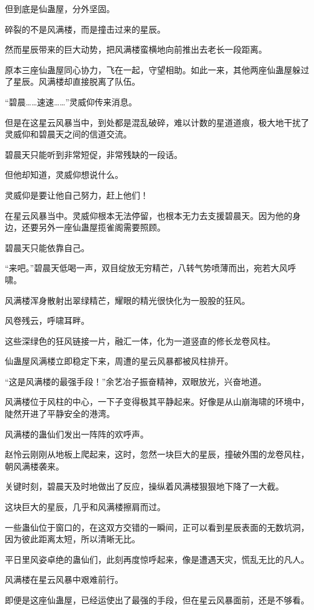 \begin{this_body}
但到底是仙蛊屋，分外坚固。

碎裂的不是风满楼，而是撞击过来的星辰。

然而星辰带来的巨大动势，把风满楼蛮横地向前推出去老长一段距离。

原本三座仙蛊屋同心协力，飞在一起，守望相助。如此一来，其他两座仙蛊屋躲过了星辰。风满楼却直接脱离了队伍。

“碧晨……速速……”灵威仰传来消息。

但是在这星云风暴当中，到处都是混乱破碎，难以计数的星道道痕，极大地干扰了灵威仰和碧晨天之间的信道交流。

碧晨天只能听到非常短促，非常残缺的一段话。

但他却知道，灵威仰想说什么。

灵威仰是要让他自己努力，赶上他们！

在星云风暴当中。灵威仰根本无法停留，也根本无力去支援碧晨天。因为他的身边，还要另外一座仙蛊屋揽雀阁需要照顾。

碧晨天只能依靠自己。

“来吧。”碧晨天低喝一声，双目绽放无穷精芒，八转气势喷薄而出，宛若大风呼啸。

风满楼浑身散射出翠绿精芒，耀眼的精光很快化为一股股的狂风。

风卷残云，呼啸耳畔。

这些深绿色的狂风链接一片，融汇一体，化为一道竖直的修长龙卷风柱。

仙蛊屋风满楼立即稳定下来，周遭的星云风暴都被风柱排开。

“这是风满楼的最强手段！”余艺冶子振奋精神，双眼放光，兴奋地道。

风满楼位于风柱的中心，一下子变得极其平静起来。好像是从山崩海啸的环境中，陡然开进了平静安全的港湾。

风满楼的蛊仙们发出一阵阵的欢呼声。

赵怜云刚刚从地板上爬起来，这时，忽然一块巨大的星辰，撞破外围的龙卷风柱，朝风满楼袭来。

关键时刻，碧晨天及时地做出了反应，操纵着风满楼狠狠地下降了一大截。

这块巨大的星辰，几乎和风满楼擦肩而过。

一些蛊仙位于窗口的，在这双方交错的一瞬间，正可以看到星辰表面的无数坑洞，因为彼此距离太短，所以清晰无比。

平日里风姿卓绝的蛊仙们，此刻再度惊呼起来，像是遭遇天灾，慌乱无比的凡人。

风满楼在星云风暴中艰难前行。

即便是这座仙蛊屋，已经运使出了最强的手段，但在星云风暴面前，还是不够看。


\end{this_body}
